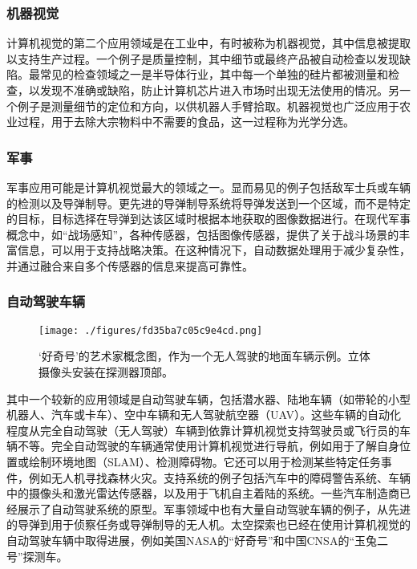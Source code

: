 \subsubsection{机器视觉}
计算机视觉的第二个应用领域是在工业中，有时被称为机器视觉，其中信息被提取以支持生产过程。一个例子是质量控制，其中细节或最终产品被自动检查以发现缺陷。最常见的检查领域之一是半导体行业，其中每一个单独的硅片都被测量和检查，以发现不准确或缺陷，防止计算机芯片进入市场时出现无法使用的情况。另一个例子是测量细节的定位和方向，以供机器人手臂拾取。机器视觉也广泛应用于农业过程，用于去除大宗物料中不需要的食品，这一过程称为光学分选。
\subsubsection{军事}
军事应用可能是计算机视觉最大的领域之一。显而易见的例子包括敌军士兵或车辆的检测以及导弹制导。更先进的导弹制导系统将导弹发送到一个区域，而不是特定的目标，目标选择在导弹到达该区域时根据本地获取的图像数据进行。在现代军事概念中，如“战场感知”，各种传感器，包括图像传感器，提供了关于战斗场景的丰富信息，可以用于支持战略决策。在这种情况下，自动数据处理用于减少复杂性，并通过融合来自多个传感器的信息来提高可靠性。
\subsubsection{自动驾驶车辆}
\begin{figure}[ht]
\centering
\texttt{[image: ./figures/fd35ba7c05c9e4cd.png]}
\caption{‘好奇号’的艺术家概念图，作为一个无人驾驶的地面车辆示例。立体摄像头安装在探测器顶部。} \label{fig_JSJ_5}
\end{figure}
其中一个较新的应用领域是自动驾驶车辆，包括潜水器、陆地车辆（如带轮的小型机器人、汽车或卡车）、空中车辆和无人驾驶航空器（UAV）。这些车辆的自动化程度从完全自动驾驶（无人驾驶）车辆到依靠计算机视觉支持驾驶员或飞行员的车辆不等。完全自动驾驶的车辆通常使用计算机视觉进行导航，例如用于了解自身位置或绘制环境地图（SLAM）、检测障碍物。它还可以用于检测某些特定任务事件，例如无人机寻找森林火灾。支持系统的例子包括汽车中的障碍警告系统、车辆中的摄像头和激光雷达传感器，以及用于飞机自主着陆的系统。一些汽车制造商已经展示了自动驾驶系统的原型。军事领域中也有大量自动驾驶车辆的例子，从先进的导弹到用于侦察任务或导弹制导的无人机。太空探索也已经在使用计算机视觉的自动驾驶车辆中取得进展，例如美国NASA的“好奇号”和中国CNSA的“玉兔二号”探测车。
